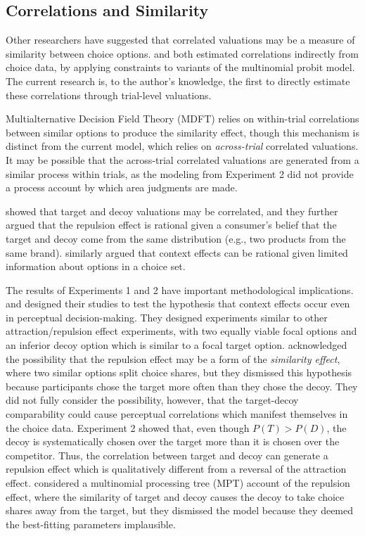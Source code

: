 \subsection{Correlations and Similarity}
Other researchers have suggested that correlated valuations may be a measure of similarity between choice options. \textcite{kamakura1984predicting} and \textcite{natenzon2019random} both estimated correlations indirectly from choice data, by applying constraints to variants of the multinomial probit model. The current research is, to the author's knowledge, the first to directly estimate these correlations through trial-level valuations. 

Multialternative Decision Field Theory (MDFT) \parencite{roeMultialternativeDecisionField2001a} relies on within-trial correlations between similar options to produce the similarity effect, though this mechanism is distinct from the current model, which relies on \textit{across-trial} correlated valuations. It may be possible that the across-trial correlated valuations are generated from a similar process within trials, as the modeling from Experiment 2 did not provide a process account by which area judgments are made.

\textcite{bhui2021rational} showed that target and decoy valuations may be correlated, and they further argued that the repulsion effect is rational given a consumer's belief that the target and decoy come from the same distribution (e.g., two products from the same brand). \textcite{bhui2024context} similarly argued that context effects can be rational given limited information about options in a choice set. 

The results of Experiments 1 and 2 have important methodological implications. \textcite{trueblood2013not} and \textcite{spektorWhenGoodLooks2018b} designed their studies to test the hypothesis that context effects occur even in perceptual decision-making. They designed experiments similar to other attraction/repulsion effect experiments, with two equally viable focal options and an inferior decoy option which is similar to a focal target option. \textcite{spektorWhenGoodLooks2018b} acknowledged the possibility that the repulsion effect may be a form of the \textit{similarity effect}, where two similar options split choice shares, but they dismissed this hypothesis because participants chose the target more often than they chose the decoy. They did not fully consider the possibility, however, that the target-decoy comparability could cause perceptual correlations which manifest themselves in the choice data. Experiment 2 showed that, even though $P(T)>P(D)$, the decoy is systematically chosen over the target more than it is chosen over the competitor. Thus, the correlation between target and decoy can generate a repulsion effect which is qualitatively different from a reversal of the attraction effect. \textcite{spektorRepulsionEffectPreferential2022} considered a multinomial processing tree (MPT) account of the repulsion effect, where the similarity of target and decoy causes the decoy to take choice shares away from the target, but they dismissed the model because they deemed the best-fitting parameters implausible.

